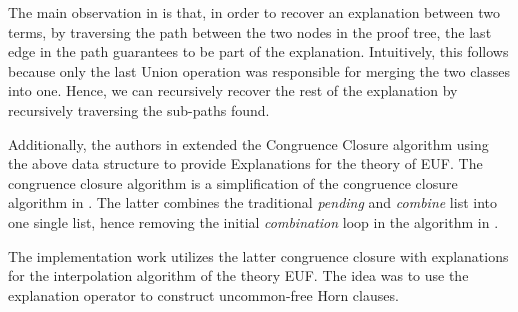 The main observation in \cite{10.1007/978-3-540-32033-3_33} 
is that, in order to recover an explanation between 
two terms, by traversing the path between the two nodes 
in the proof tree, the last edge in the path guarantees to 
be part of the explanation. Intuitively, this follows 
because only 
the last Union operation was responsible for merging the 
two classes into one. Hence, we can recursively recover 
the rest of the explanation by recursively traversing 
the sub-paths found.

Additionally, the authors in 
\cite{10.1007/978-3-540-32033-3_33} 
extended the Congruence Closure algorithm 
\cite{10.1007/978-3-540-39813-4_5} using the above data 
structure to provide Explanations for the theory of EUF.  
The congruence closure algorithm is a 
simplification of the congruence 
closure algorithm in \cite{10.1145/322217.322228}. The latter 
combines the traditional \emph{pending} and \emph{combine} list 
into one single list, hence removing the initial 
\emph{combination} loop in the algorithm in 
\cite{10.1145/322217.322228}.

The implementation work utilizes the latter congruence closure
with explanations for the interpolation algorithm of the 
theory EUF. The idea was to use the explanation operator
to construct uncommon-free Horn clauses.

